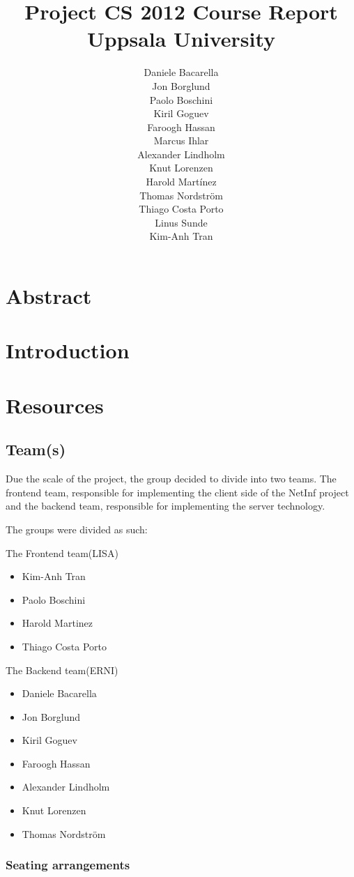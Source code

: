 \documentclass[11pt]{report}
\title{Project CS 2012 Course Report\\Uppsala University\\}
\author{Daniele Bacarella\\
Jon Borglund\\
Paolo Boschini\\
Kiril Goguev\\
		Faroogh Hassan\\
		Marcus Ihlar\\
		Alexander Lindholm\\
		Knut Lorenzen\\
		Harold Martínez\\
		Thomas Nordstr\"om\\
		Thiago Costa Porto\\
		Linus Sunde\\
		Kim-Anh Tran
}
\date{}
\begin{document}
\maketitle

\tableofcontents

\chapter{Abstract}


\chapter{Introduction}

\chapter{Resources}

\section{Team(s)}
Due the scale of the project, the group decided to divide into two teams. The frontend team, responsible for implementing the client side of the NetInf project and the backend team, responsible for implementing the server technology.


The groups were divided as such:

The Frontend team(LISA)
\begin{itemize}
\item Kim-Anh Tran
\item Paolo Boschini
\item Harold Martinez
\item Thiago Costa Porto
\end{itemize}

The Backend team(ERNI) 

\begin {itemize}
\item Daniele Bacarella
\item Jon Borglund
\item Kiril Goguev
\item Faroogh Hassan
\item Alexander Lindholm
\item Knut Lorenzen
\item Thomas Nordstr\"om
\end {itemize}

\subsection{Seating arrangements}
\end{document}
